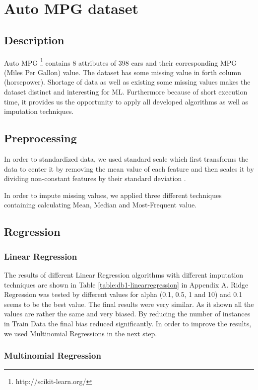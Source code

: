 \section{Auto MPG dataset}
\subsection{Description}
Auto MPG \footnote{http://scikit-learn.org/} contains 8 attributes of 398 cars  and their corresponding MPG (Miles Per Gallon) value. The dataset has some missing value in forth column (horsepower). Shortage of data as well as existing some missing values makes the dataset distinct and interesting for ML. Furthermore because of short execution time, it provides us the opportunity to apply all developed algorithms as well as imputation techniques.

\subsection{Preprocessing}
In order to standardized data, we used standard scale which first transforms the data to center it by removing the mean value of each feature and then scales it by dividing non-constant features by their standard deviation \cite{scikitstandardization}.

In order to impute missing values, we applied three different techniques containing calculating Mean, Median and Most-Frequent value.

\subsection{Regression}
\subsubsection{Linear Regression}
The results of different Linear Regression algorithms with different imputation techniques are shown in Table \ref{table:db1-linearregression} in Appendix A. Ridge Regression was tested by different values for alpha (0.1, 0.5, 1 and 10) and 0.1 seems to be the best value. The final results were very similar. As it shown all the values are rather the same and very biased. By reducing the number of instances in Train Data the final bias reduced significantly. In order to improve the results, we used Multinomial Regressions in the next step.

\subsubsection{Multinomial Regression}

